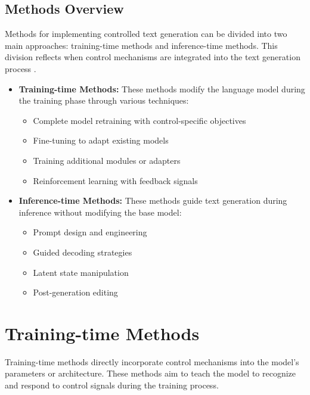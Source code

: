 \subsection{Methods Overview}

Methods for implementing controlled text generation can be divided into two main approaches: training-time methods and inference-time methods. 
This division reflects when control mechanisms are integrated into the text generation process \cite{liang2024controllabletextgenerationlarge, he-etal-2022-ctrlsum}.

\begin{itemize}
   \item \textbf{Training-time Methods:} These methods modify the language model during the training phase through various techniques:
        \begin{itemize}
            \item Complete model retraining with control-specific objectives
            \item Fine-tuning to adapt existing models
            \item Training additional modules or adapters
            \item Reinforcement learning with feedback signals
        \end{itemize}
       
   \item \textbf{Inference-time Methods:} These methods guide text generation during inference without modifying the base model:
       \begin{itemize}
            \item Prompt design and engineering
            \item Guided decoding strategies
            \item Latent state manipulation
            \item Post-generation editing 
        \end{itemize}
\end{itemize}

\section{Training-time Methods}
\label{c2:s:training-time}

Training-time methods directly incorporate control mechanisms into the model's parameters or architecture. These methods aim to teach the model to recognize and respond to control signals during the training process.

